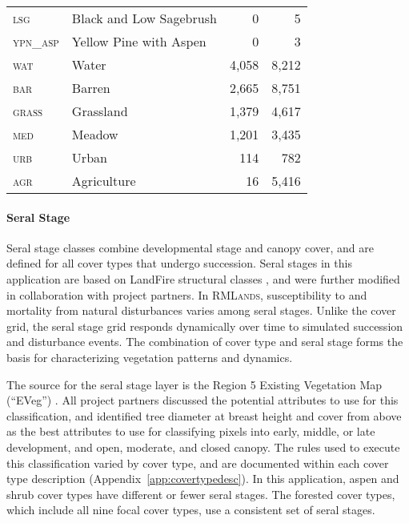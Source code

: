 \begin{table}[!htbp]
\begin{tabular}{@{}llrr@{}}
\rowcolor[HTML]{CAD6BA} \textsc{lsg     }     & Black and Low Sagebrush                      & 0           & 5          \\
                        \textsc{ypn\_asp}     & Yellow Pine with Aspen                       & 0           & 3          \\ 
\midrule
                        \textsc{wat     }     & Water                                        & 4,058       & 8,212      \\
\rowcolor[HTML]{CAD6BA} \textsc{bar     }     & Barren                                       & 2,665       & 8,751      \\
                        \textsc{grass   }     & Grassland                                    & 1,379       & 4,617      \\
\rowcolor[HTML]{CAD6BA} \textsc{med     }     & Meadow                                       & 1,201       & 3,435      \\
                        \textsc{urb     }     & Urban                                        & 114         & 782        \\
\rowcolor[HTML]{CAD6BA} \textsc{agr     }     & Agriculture                                  & 16          & 5,416      \\
\bottomrule

\end{tabular}
\end{table}

\paragraph*{Seral Stage}
Seral stage classes combine developmental stage and canopy cover, and are defined for all cover types that undergo succession. Seral stages in this application are based on LandFire structural classes \citep{Landfire2007}, and were further modified in collaboration with project partners. In \textsc{RMLands}, susceptibility to and mortality from natural disturbances varies among seral stages. Unlike the cover grid, the seral stage grid responds dynamically over time to simulated succession and disturbance events. The combination of cover type and seral stage forms the basis for characterizing vegetation patterns and dynamics.

The source for the seral stage layer is the Region 5 Existing Vegetation Map (``EVeg'') \citep{USDAForestService2009}. All project partners discussed the potential attributes to use for this classification, and identified tree diameter at breast height and cover from above as the best attributes to use for classifying pixels into early, middle, or late development, and open, moderate, and closed canopy. The rules used to execute this classification varied by cover type, and are documented within each cover type description (Appendix~\ref{app:covertypedesc}). In this application, aspen and shrub cover types have different or fewer seral stages. The forested cover types, which include all nine focal cover types, use a consistent set of seral stages.

